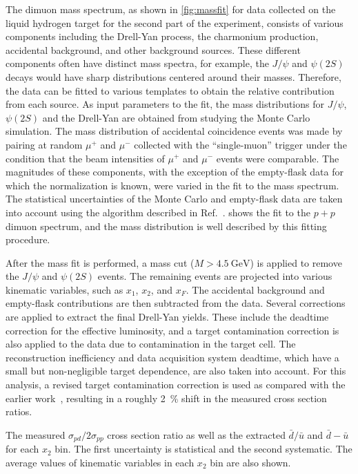 \documentclass[reprint,aps,unsortedaddress,superscriptaddress,prl,floatfix,showpacs,linenumbers]{revtex4-2}
\begin{document}
The dimuon mass spectrum, as shown in \cref{fig:massfit} for data collected
on the liquid hydrogen target for the second part of the experiment, consists
of various components including the Drell-Yan process, the charmonium
production, accidental background, and other background sources.
These different components often have distinct mass spectra, for example, the $J/\psi$
and $\psi\left(2S\right)$ decays would have sharp distributions centered around their masses.
Therefore, the data can be fitted to various templates to obtain
the relative contribution from each source.
As input parameters to the fit, the mass distributions for $J/\psi$, $\psi\left(2S\right)$
and the Drell-Yan are obtained from studying the Monte Carlo simulation. %
The mass distribution of accidental coincidence events was made by pairing at random $\mu^+$ and $\mu^-$ collected with the ``single-muon'' trigger
under the condition that the beam intensities of $\mu^+$ and $\mu^-$ events were comparable.
The magnitudes of these components,
with the exception of the empty-flask data for which the normalization is known,
were varied in the fit to the mass spectrum.
The statistical uncertainties of the Monte Carlo and empty-flask data are taken into account using the algorithm described in Ref.~\cite{barlow1993}.
 shows the fit to the $p+p$ dimuon spectrum,
and the mass distribution is well described by this fitting procedure.

After the mass fit is performed,
a mass cut ($M>\SI{4.5}{\GeV}$) is applied to remove the $J/\psi$ and $\psi\left(2S\right)$ events.
The remaining events are projected into various kinematic variables, such as $x_1$, $x_2$, and $x_F$. %
The accidental background and empty-flask contributions are then subtracted from the data.
Several corrections are applied to extract the final Drell-Yan yields.
These include the deadtime correction for the effective luminosity,
and a target contamination correction is also applied to the  data due to  contamination in the target cell.
The reconstruction inefficiency and data acquisition system deadtime, which have a small but non-negligible target dependence,
are also taken into account.
For this analysis,
a revised target contamination correction is used as compared with the earlier work~\cite{dove2021,dove2023},
resulting in a roughly \SI{2}{\percent} shift in the measured cross section ratios.

\begin{table}[htbp!]
	\centering
	\caption{The measured $\sigma_{pd}/2\sigma_{pp}$ cross section ratio as well
		as the extracted $\bar{d}/\bar{u}$ and $\bar{d}-\bar{u}$ for each $x_{2}$ bin.
		The first uncertainty is statistical and the second systematic.
		The average values of kinematic variables in each $x_2$ bin are also shown.}
	\label{tab:dbarubar}
	\begin{adjustbox}{max width=\textwidth}
		
	\end{adjustbox}
\end{table}
\end{document}
